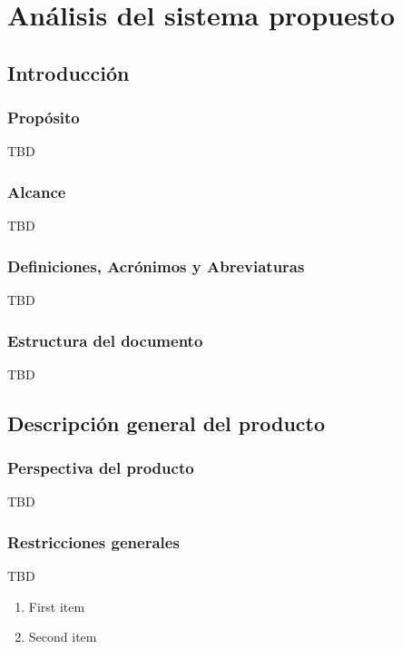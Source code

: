 \chapter{Análisis del sistema propuesto}
\label{chapter:analisis}


\section{Introducción}

    \subsection{Propósito}
        TBD
        
    \subsection{Alcance}
        TBD
        
    \subsection{Definiciones, Acrónimos y Abreviaturas}
        TBD
        
    \subsection{Estructura del documento}
        TBD
        
\section{Descripción general del producto}

    \subsection{Perspectiva del producto}
        TBD
        
    \subsection{Restricciones generales}
        TBD
        \begin{enumerate}[label=R\arabic*]
            \item First item
            \item Second item
        \end{enumerate}
    
